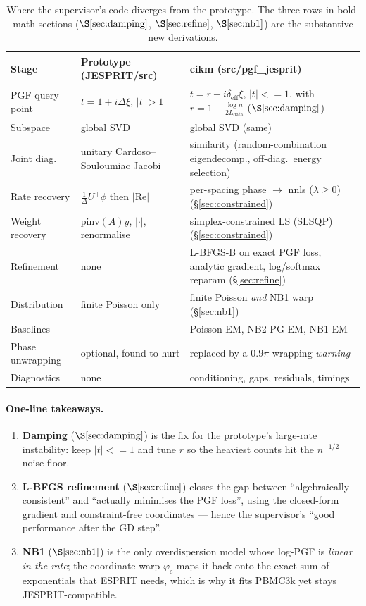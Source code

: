 \documentclass[11pt]{article}
\newcommand{\lam}{\bm{\lambda}}
\newcommand{\bt}{\bm{t}}
\newcommand{\bxi}{\bm{\xi}}
\newcommand{\deff}{\delta_{\mathrm{eff}}}
\newcommand{\code}[1]{\texttt{\small #1}}
\def\code#1{#1}%
\def\small{}%
\def\bm#1{#1}%
\def\bt{t}%
\def\le{<=}%
\theoremstyle{definition}
\begin{document}
\begin{table}[h]
\centering
\small
\renewcommand{\arraystretch}{1.25}
\begin{tabular}{p{3.4cm} p{5.0cm} p{5.6cm}}
\toprule
Stage & Prototype (\code{JESPRIT/src}) & cikm (\code{src/pgf\_jesprit}) \\
\midrule
PGF query point & $\bt=\bm1+i\Delta\bxi$, $|\bt|>1$ & $\bt=r+i\deff\bxi$, $|\bt|\le1$, with $r=1-\frac{\log n}{2L_{\mathrm{data}}}$ ($\S\ref{sec:damping}$) \\
Subspace & global SVD & global SVD (same) \\
Joint diag.\ & unitary Cardoso--Souloumiac Jacobi & similarity (random-combination eigendecomp., off-diag.\ energy selection) \\
Rate recovery & $\frac1\Delta U^{+}\bm\phi$ then $|\mathrm{Re}|$ & per-spacing phase $\to$ \code{nnls} ($\lam\ge0$) (\S\ref{sec:constrained}) \\
Weight recovery & $\mathrm{pinv}(A)\bm y$, $|\cdot|$, renormalise & simplex-constrained LS (SLSQP) (\S\ref{sec:constrained}) \\
Refinement & none & L-BFGS-B on exact PGF loss, analytic gradient, log/softmax reparam (\S\ref{sec:refine}) \\
Distribution & finite Poisson only & finite Poisson \emph{and} NB1 warp (\S\ref{sec:nb1}) \\
Baselines & --- & Poisson EM, NB2 PG EM, NB1 EM \\
Phase unwrapping & optional, found to hurt & replaced by a $0.9\pi$ wrapping \emph{warning} \\
Diagnostics & none & conditioning, gaps, residuals, timings \\
\bottomrule
\end{tabular}
\caption{Where the supervisor's code diverges from the prototype. The three rows in bold-math
sections ($\S\ref{sec:damping}$, $\S\ref{sec:refine}$, $\S\ref{sec:nb1}$) are the substantive
new derivations.}
\end{table}

\paragraph{One-line takeaways.}
\begin{enumerate}[leftmargin=2em, itemsep=1pt]
  \item \textbf{Damping} ($\S\ref{sec:damping}$) is the fix for the prototype's
        large-rate instability: keep $|\bt|\le1$ and tune $r$ so the heaviest counts hit the
        $n^{-1/2}$ noise floor.
  \item \textbf{L-BFGS refinement} ($\S\ref{sec:refine}$) closes the gap between ``algebraically
        consistent'' and ``actually minimises the PGF loss'', using the closed-form gradient and
        constraint-free coordinates --- hence the supervisor's ``good performance after the GD
        step''.
  \item \textbf{NB1} ($\S\ref{sec:nb1}$) is the only overdispersion model whose log-PGF is
        \emph{linear in the rate}; the coordinate warp $\varphi_c$ maps it back onto the exact
        sum-of-exponentials that ESPRIT needs, which is why it fits PBMC3k yet stays
        JESPRIT-compatible.
\end{enumerate}
\end{document}
